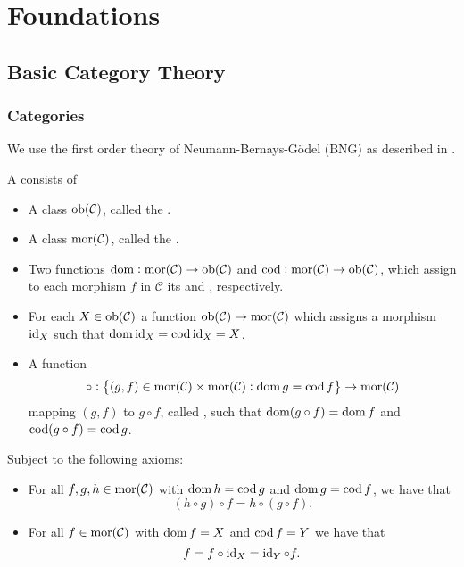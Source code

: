 \chapter{Foundations}
\section*{Basic Category Theory}
\subsection*{Categories}

We use the first order theory of Neumann-Bernays-G\"odel (BNG) as described in \cite[231]{mendelson:logic:2015}.

\begin{definition}[Category]
	A  consists of 
	\begin{itemize}[leftmargin = *]
		\item A class $\operatorname{ob}(\mathcal{C})$, called the .
		\item A class $\operatorname{mor}(\mathcal{C})$, called the .
		\item Two functions $\operatorname{dom} : \operatorname{mor}(\mathcal{C}) \to \operatorname{ob}(\mathcal{C})$ and $\operatorname{cod} : \operatorname{mor}(\mathcal{C}) \to \operatorname{ob}(\mathcal{C})$, which assign to each morphism $f$ in $\mathcal{C}$ its  and , respectively.
		\item For each $X \in \operatorname{ob}(\mathcal{C})$ a function $\operatorname{ob}(\mathcal{C}) \to \operatorname{mor}(\mathcal{C})$ which assigns a morphism $\operatorname{id}_X$ such that $\operatorname{dom} \operatorname{id}_X = \operatorname{cod} \operatorname{id}_X = X$.
		\item A function 
			\begin{equation}
				\circ : \cbr{(g,f) \in \mor(\mathcal{C}) \times \mor(\mathcal{C}) : \dom g = \cod f} \to \mor(\mathcal{C}) 
			\end{equation}
			mapping $(g,f)$ to $g \circ f$, called , such that $\operatorname{dom}(g \circ f) = \operatorname{dom} f$ and $\operatorname{cod}(g \circ f) = \operatorname{cod} g$.
	\end{itemize}
	Subject to the following axioms:
	\begin{itemize}[leftmargin = *]
		\item {} For all $f,g,h \in \operatorname{mor}(\mathcal{C})$ with $\operatorname{dom} h = \operatorname{cod} g$ and $\operatorname{dom} g = \operatorname{cod} f$, we have that
			\begin{equation}
				(h \circ g) \circ f = h \circ (g \circ f).
			\end{equation}
		\item {} For all $f \in \operatorname{mor}(\mathcal{C})$ with $\operatorname{dom} f = X$ and $\operatorname{cod} f = Y$ we have that
			\begin{equation}
				f = f \circ \operatorname{id}_X = \operatorname{id}_Y \circ f.
			\end{equation}
	\end{itemize}
\end{definition}

